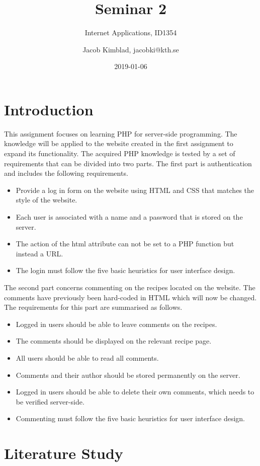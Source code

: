 \documentclass[a4paper]{scrartcl}
\title{Seminar 2}
\subtitle{Internet Applications, ID1354}
\author{Jacob Kimblad, jacobki@kth.se}
\date{2019-01-06}
\begin{document}
\maketitle

\section{Introduction}

This assignment focuses on learning PHP for server-side programming. The knowledge will be applied to the website created in the first assignment to expand its functionality. The acquired PHP knowledge is tested by a set of requirements that can be divided into two parts. The first part is authentication and includes the following requirements.
\begin{itemize}
    \item Provide a log in form on the website using HTML and CSS that matches the style of the website.
    \item Each user is associated with a name and a password that is stored on the server.
    \item The action of the html attribute can not be set to a PHP function but instead a URL.
    \item The login must follow the five basic heuristics for user interface design. 
\end{itemize}

The second part concerns commenting on the recipes located on the website. The comments have previously been hard-coded in HTML which will now be changed. The requirements for this part are summarised as follows.
\begin{itemize}
    \item Logged in users should be able to leave comments on the recipes.
    \item The comments should be displayed on the relevant recipe page.
    \item All users should be able to read all comments.
    \item Comments and their author should be stored permanently on the server.
    \item Logged in users should be able to delete their own comments, which needs to be verified server-side.
    \item Commenting must follow the five basic heuristics for user interface design.
\end{itemize}
\section{Literature Study}
\end{document}
